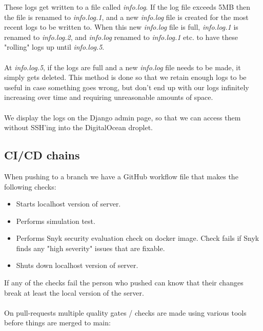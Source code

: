 These logs get written to a file called \textit{info.log}. If the log file exceeds 5MB then the file is renamed to \textit{info.log.1}, and a new \textit{info.log} file is created for the most recent logs to be written to. When this new \textit{info.log} file is full, \textit{info.log.1} is renamed to \textit{info.log.2}, and \textit{info.log} renamed to \textit{info.log.1} etc. to have these "rolling" logs up until \textit{info.log.5}.
\\\\
At \textit{info.log.5}, if the logs are full and a new \textit{info.log} file needs to be made, it simply gets deleted. This method is done so that we retain enough logs to be useful in case something goes wrong, but don't end up with our logs infinitely increasing over time and requiring unreasonable amounts of space.
\\\\
We display the logs on the Django admin page, so that we can access them without SSH'ing into the DigitalOcean droplet.

\subsection{CI/CD chains}


When pushing to a branch we have a GitHub workflow file that makes the following checks:

\begin{itemize}
    \item Starts localhost version of server.
    \item Performs simulation test.
    \item Performs Snyk security evaluation check on docker image. Check fails if Snyk finds any "high severity" issues that are fixable.
    \item Shuts down localhost version of server.
\end{itemize}

If any of the checks fail the person who pushed can know that their changes break at least the local version of the server.
\\\\
On pull-requests multiple quality gates / checks are made using various tools before things are merged to main:

